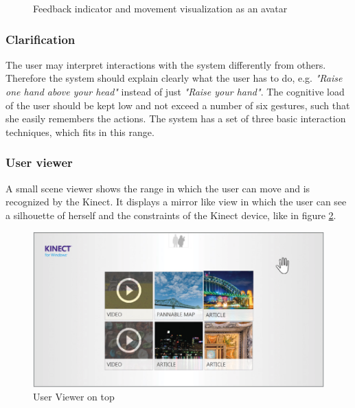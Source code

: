 \begin{figure}[htb]
\begin{minipage}[t]{0.49\linewidth}
		\label{fig:visualFeedbackAvatar}
	\end{minipage}
	\caption{Feedback indicator and movement visualization as an avatar~\cite{MicrosoftHIG2014-mh}}
	\label{fig:hciGuidelinesIndicatorAvatar}
\end{figure}

\subsubsection{Clarification}
The user may interpret interactions with the system differently from others. Therefore the system should explain clearly what the user has to do, e.g. \textit{"Raise one hand above your head"} instead of just \textit{"Raise your hand"}. The cognitive load of the user should be kept low and not exceed a number of six gestures, such that she easily remembers the actions. The system has a set of three basic interaction techniques, which fits in this range.

\subsubsection{User viewer}
A small scene viewer shows the range in which the user can move and is recognized by the Kinect. It displays a mirror like view in which the user can see a silhouette of herself and the constraints of the Kinect device, like in figure \ref{fig:higUserViewer}.
\begin{figure}[htb]
	\centering
	\begin{minipage}[t]{1\linewidth}
		\centering
		\includegraphics[width=0.6\linewidth]{Pictures/higUserViewer}
		\caption{User Viewer on top~\cite{MicrosoftHIG2014-mh}}
		\label{fig:higUserViewer}
	\end{minipage}
\end{figure}

